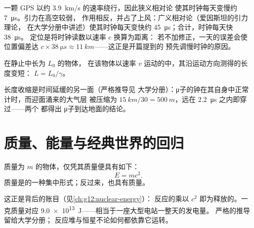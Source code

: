 \begin{remark}\label{rem:g12:special-relativity:gps}
一颗 GPS 以约 \qty{3.9}{km/s} 的速率绕行，因此狭义相对论
使其时钟每天变慢约 \qty{7}{\micro s}。引力在高空较弱，
作用相反，并占了上风：广义相对论（爱因斯坦的引力理论，
在大学分册中讲述）使其时钟每天变快约
\qty{45}{\micro s}；合计，时钟每天快 \qty{38}{\micro s}。
定位是将时钟读数以速率 $c$ 换算为距离：
若不加修正，一天的误差会使位置偏差达
$c \times \qty{38}{\micro s} \approx \qty{11}{km}$——这正是开篇提到的
预先调慢时钟的原因。
\end{remark}

\begin{proposition}[长度收缩]\label{prop:g12:special-relativity:contraction}
在静止中长为 $L_0$ 的物体，
在该物体以速率 $v$ 运动的中，其沿运动方向测得的长度变短：
$L = L_0/\gamma$。
\end{proposition}
\admitted

\begin{remark}[μ子自身的视角]\label{rem:g12:special-relativity:muonframe}
长度收缩是时间延缓的另一面（严格推导见
大学分册）：μ子的钟在其自身中正常计时，而迎面涌来的大气层
被压缩为 $\qty{15}{km}/30 =
\qty{500}{m}$，远在 \qty{2.2}{\micro s} 之内即穿过——两个
都得出 μ子到达地面的结论。
\end{remark}

\section{质量、能量与经典世界的回归}

\begin{theorem}[质量–能量等价]\label{thm:g12:special-relativity:emc2}
质量为 $m$ 的物体，仅凭其质量便具有如下：
\[ E = m c^2 . \]
质量是的一种集中形式；反过来，也具有质量。
\end{theorem}
\admitted

\begin{remark}[你在哪里见过它]\label{rem:g12:special-relativity:emc2seen}
这正是背后的账目（见\cref{ch:g12:nuclear-energy}）：
反应的乘以 $c^2$ 即为释放的。一
克质量对应 \qty{9.0e13}{J}——相当于一座大型电站一整天的发电量。
严格的推导留给大学分册；
反应堆与恒星不论如何都依靠它运转。
\end{remark}


